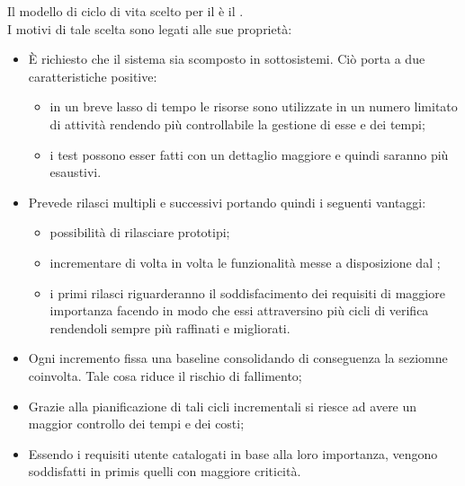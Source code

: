 		Il modello di ciclo di vita scelto per il  è il \underline{}.\\
		I motivi di tale scelta sono legati alle sue proprietà:
		\begin{itemize}
			\item È richiesto che il sistema sia scomposto in sottosistemi. Ciò porta a due caratteristiche positive:
			\begin{itemize}
				\item in un breve lasso di tempo le risorse sono utilizzate in un numero limitato di attività rendendo più controllabile la gestione di esse e dei tempi;
				\item i test possono esser fatti con un dettaglio maggiore e quindi saranno più esaustivi.
			\end{itemize}
			\item Prevede rilasci multipli e successivi portando quindi i seguenti vantaggi:
			\begin{itemize}
				\item possibilità di rilasciare prototipi;
				\item incrementare di volta in volta le funzionalità messe a disposizione dal ;
				\item i primi rilasci riguarderanno il soddisfacimento dei requisiti di maggiore importanza facendo in modo che essi attraversino più cicli di verifica rendendoli sempre più raffinati e migliorati.
			\end{itemize}
			\item Ogni incremento fissa una baseline consolidando di conseguenza la seziomne coinvolta. Tale cosa riduce il rischio di fallimento;
			\item Grazie alla pianificazione di tali cicli incrementali si riesce ad avere un maggior controllo dei tempi e dei costi;
			\item Essendo i requisiti utente catalogati in base alla loro importanza, vengono soddisfatti in primis quelli con maggiore criticità.
		\end{itemize}